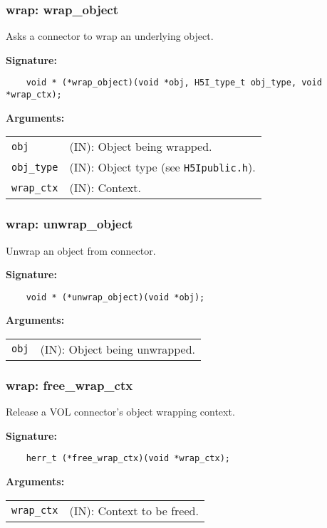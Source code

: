 \subsubsection{wrap: wrap\_object}
Asks a connector to wrap an underlying object.

\begin{mdframed}[style=bgbox]
\textbf{Signature:}
\begin{lstlisting}
    void * (*wrap_object)(void *obj, H5I_type_t obj_type, void *wrap_ctx);
\end{lstlisting}

\textbf{Arguments:}\\
\begin{tabular}{l p{13.5cm}}
  \texttt{obj} & (IN): Object being wrapped.\\
  \texttt{obj\_type} & (IN): Object type (see \texttt{H5Ipublic.h}).\\
  \texttt{wrap\_ctx} & (IN): Context.\\
\end{tabular}
\end{mdframed}

\subsubsection{wrap: unwrap\_object}
Unwrap an object from connector.

\begin{mdframed}[style=bgbox]
\textbf{Signature:}
\begin{lstlisting}
    void * (*unwrap_object)(void *obj);
\end{lstlisting}

\textbf{Arguments:}\\
\begin{tabular}{l p{13.5cm}}
  \texttt{obj} & (IN): Object being unwrapped.\\
\end{tabular}
\end{mdframed}

\subsubsection{wrap: free\_wrap\_ctx}
Release a VOL connector's object wrapping context.

\begin{mdframed}[style=bgbox]
\textbf{Signature:}
\begin{lstlisting}
    herr_t (*free_wrap_ctx)(void *wrap_ctx);
\end{lstlisting}

\textbf{Arguments:}\\
\begin{tabular}{l p{13.5cm}}
  \texttt{wrap\_ctx} & (IN): Context to be freed.\\
\end{tabular}
\end{mdframed}


